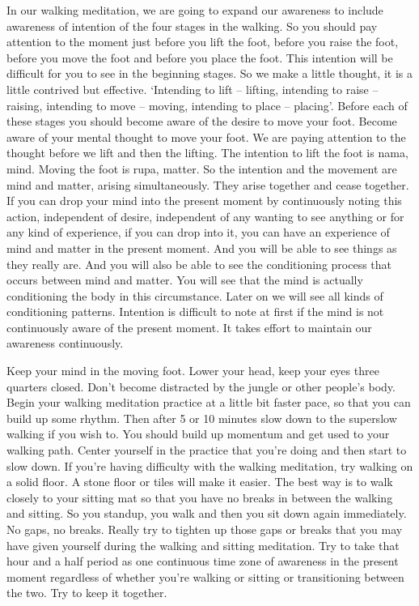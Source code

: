 \documentclass[letterpaper,10pt,english]{sphinxmanual}
\begin{document}
\sphinxAtStartPar
In our walking meditation, we are going to expand our awareness to
include  awareness  of  intention  of  the  four  stages  in  the  walking.  So  you
should pay attention to the moment just before you lift the foot, before you
raise the foot, before you move the foot and before you place the foot. This
intention will be difficult for you to see in the beginning stages. So we make
a little thought, it is a little contrived but effective. ‘Intending to lift – lifting,
intending to raise – raising, intending to move – moving, intending to place –
placing’. Before each of these stages you should become aware of the desire
to move your foot. Become aware of your mental thought to move your foot.
  We are paying attention to the thought before we lift and then the lifting. The
intention to lift the foot is nama, mind. Moving the foot is rupa, matter. So
the intention and the movement are mind and matter, arising simultaneously.
They arise together and cease together. If you can drop your mind into the
present moment by continuously noting this action, independent of desire,
independent of any wanting to see anything or for any kind of experience, if
you can drop into it, you can have an experience of mind and matter in the
present moment. And you will be able to see things as they really are. And
you  will  also  be  able  to  see  the  conditioning  process  that  occurs  between
mind and matter. You will see that the mind is actually conditioning the body
in this circumstance. Later on we will see all kinds of conditioning patterns.
Intention  is  difficult  to  note  at  first  if  the  mind  is  not  continuously
aware of the present moment. It takes effort to maintain our awareness continuously.

\sphinxAtStartPar
Keep your mind in the moving foot. Lower your head, keep your eyes
three quarters closed. Don’t become distracted by the jungle or other people’s body. Begin your walking meditation practice at a little bit faster pace,
so that you can build up some rhythm. Then after 5 or 10 minutes slow down
to the super\sphinxhyphen{}slow walking if you wish to. You should build up momentum
and get used to your walking path. Center yourself in the practice that you’re
doing and then start to slow down. If you’re having difficulty with the walking meditation, try walking on a solid floor. A stone floor or tiles will make
it easier. The best way is to walk closely to your sitting mat so that you have
no  breaks  in  between  the  walking  and  sitting.  So  you  stand\sphinxhyphen{}up,  you  walk
and  then  you  sit  down  again  immediately.  No  gaps,  no  breaks.  Really  try
to tighten up those gaps or breaks that you may have given yourself during
the walking and sitting meditation. Try to take that hour and a half period
as one continuous time zone of awareness in the present moment regardless
of whether you’re walking or sitting or transitioning between the two. Try to
keep it together.
\end{document}
